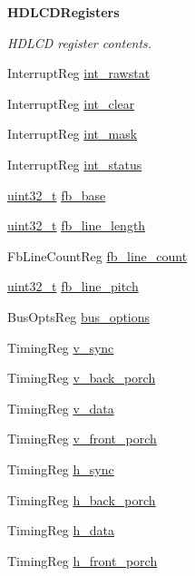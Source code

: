 \begin{Indent}{\bf HDLCDRegisters}\par
{\em \label{_amgrp3601e4e51ceca70a1552af1813e558c3}
 HDLCD register contents. }\begin{DoxyCompactItemize}
\item 
InterruptReg \hyperlink{classHDLcd_af1d60d459d94a3bef2f6e83bdc4c1c43}{int\_\-rawstat}
\item 
InterruptReg \hyperlink{classHDLcd_ab96a978a299a4bf65839845c1c33f414}{int\_\-clear}
\item 
InterruptReg \hyperlink{classHDLcd_a8343af5ba122012f4b5b3515d8675b7e}{int\_\-mask}
\item 
InterruptReg \hyperlink{classHDLcd_a814b02fed91486dd6000055cd1c43e1d}{int\_\-status}
\item 
\hyperlink{Type_8hh_a435d1572bf3f880d55459d9805097f62}{uint32\_\-t} \hyperlink{classHDLcd_ad9fd5ba71c5b40acdb6fd9adc4fa408b}{fb\_\-base}
\item 
\hyperlink{Type_8hh_a435d1572bf3f880d55459d9805097f62}{uint32\_\-t} \hyperlink{classHDLcd_ab09d20d3fb341f97725e4f27efbee0bd}{fb\_\-line\_\-length}
\item 
FbLineCountReg \hyperlink{classHDLcd_a91b3e136cdfa6ff77cbb933239223919}{fb\_\-line\_\-count}
\item 
\hyperlink{Type_8hh_a435d1572bf3f880d55459d9805097f62}{uint32\_\-t} \hyperlink{classHDLcd_a4f20b06285d7a67e4182c190c282ab9b}{fb\_\-line\_\-pitch}
\item 
BusOptsReg \hyperlink{classHDLcd_afdc67b9cdc0c178e0855cbe989449577}{bus\_\-options}
\item 
TimingReg \hyperlink{classHDLcd_ac1d1b9a4346f8ab7231a25ba0524ac99}{v\_\-sync}
\item 
TimingReg \hyperlink{classHDLcd_a47ccc8b58ab3dffa549476540cfff908}{v\_\-back\_\-porch}
\item 
TimingReg \hyperlink{classHDLcd_a5a46b3a3d299f421a250c4ca6ca7d17c}{v\_\-data}
\item 
TimingReg \hyperlink{classHDLcd_ad663411b973f7cad0938ca048f683088}{v\_\-front\_\-porch}
\item 
TimingReg \hyperlink{classHDLcd_a91efa037cb143bc92279f190b4423748}{h\_\-sync}
\item 
TimingReg \hyperlink{classHDLcd_a2bafb13ce63125c580ceb36a81af2817}{h\_\-back\_\-porch}
\item 
TimingReg \hyperlink{classHDLcd_a3610505ba43835b9d3dd548e1848644e}{h\_\-data}
\item 
TimingReg \hyperlink{classHDLcd_ab4874d5422f23d038b1a7274da8f43e7}{h\_\-front\_\-porch}

\end{DoxyCompactItemize}
\end{Indent}
